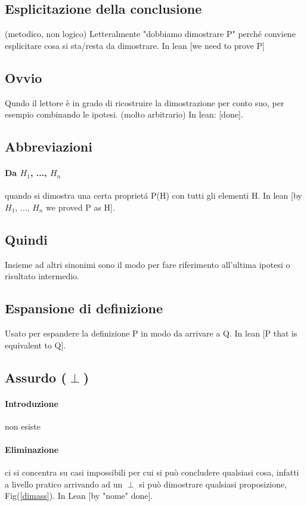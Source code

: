 \documentclass{article}
\begin{document}
\subsection{Esplicitazione della conclusione} (metodico, non logico) Letteralmente "dobbiamo dimostrare P" perché conviene esplicitare cosa si sta/resta da dimostrare. 
In lean [we need to prove P]

\subsection{Ovvio} Qundo il lettore è in grado di ricostruire la dimostrazione per conto suo, per esempio combinando le ipotesi. (molto arbitrario)
In lean: [done].

\subsection{Abbreviazioni} 
\paragraph{Da $H_1$, ..., $H_n$} quando si dimostra una certa proprietá P(H) con tutti gli elementi H. In lean [by $H_1$, ..., $H_n$ we proved P as H].

\subsection{Quindi} Insieme ad altri sinonimi sono il modo per fare riferimento all'ultima ipotesi o risultato intermedio.
\subsection{Espansione di definizione} Usato per espandere la definizione P in modo da arrivare a Q. In lean [P that is equivalent to Q].

\subsection{Assurdo ($\perp$)}
\paragraph{Introduzione} non esiste
\paragraph{Eliminazione} ci si concentra su casi impossibili per cui si può concludere qualsiasi cosa, infatti a livello pratico arrivando ad un $\perp$ si può dimostrare qualsiasi proposizione, Fig(\ref{dimass}). In Lean [by "nome" done].
\end{document}
